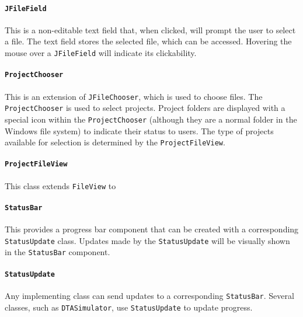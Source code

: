 \paragraph*{\texttt{JFileField}}
This is a non-editable text field that, when clicked, will prompt the user to select a file. The text field stores the selected file, which can be accessed. Hovering the mouse over a \texttt{JFileField} will indicate its clickability.

\paragraph*{\texttt{ProjectChooser}}
This is an extension of \texttt{JFileChooser}, which is used to choose files. The \texttt{ProjectChooser} is used to select projects. Project folders are displayed with a special icon within the \texttt{ProjectChooser} (although they are a normal folder in the Windows file system) to indicate their status to users. The type of projects available for selection is determined by the \texttt{ProjectFileView}.

\paragraph*{\texttt{ProjectFileView}}
This class extends \texttt{FileView} to 

\paragraph*{\texttt{StatusBar}} This provides a progress bar component that can be created with a corresponding \texttt{StatusUpdate} class. Updates made by the \texttt{StatusUpdate} will be visually shown in the \texttt{StatusBar} component.

\paragraph*{\texttt{StatusUpdate}} Any implementing class can send updates to a corresponding \texttt{StatusBar}. Several classes, such as \texttt{DTASimulator}, use \texttt{StatusUpdate} to update progress.


